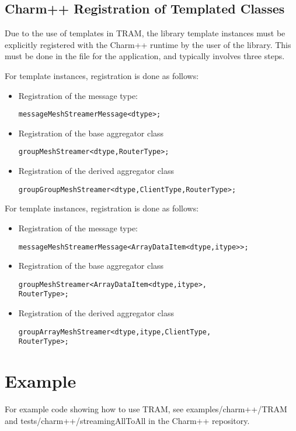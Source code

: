 \subsection{Charm++ Registration of Templated Classes}

Due to the use of templates in TRAM, the library template instances must be
explicitly registered with the Charm++ runtime by the user of the library. This
must be done in the  file for the application, and typically involves
three steps.

For  template instances, registration is done as
follows:
\begin{itemize}
\item{Registration of the message type:}
\begin{alltt}
message MeshStreamerMessage<dtype>;
\end{alltt}
\item{Registration of the base aggregator class}
\begin{alltt}
group MeshStreamer<dtype, RouterType>;
\end{alltt}
\item{Registration of the derived aggregator class}
\begin{alltt}
group GroupMeshStreamer<dtype, ClientType, RouterType>;
\end{alltt}
\end{itemize}

For  template instances, registration is done as
follows:
\begin{itemize}
\item{Registration of the message type:}
\begin{alltt}
message MeshStreamerMessage<ArrayDataItem<dtype, itype> >;
\end{alltt}
\item{Registration of the base aggregator class}
\begin{alltt}
group MeshStreamer<ArrayDataItem<dtype, itype>,
                   RouterType>;
\end{alltt}
\item{Registration of the derived aggregator class}
\begin{alltt}
group ArrayMeshStreamer<dtype, itype, ClientType,
                        RouterType>;
\end{alltt}
\end{itemize}

\section{Example}

For example code showing how to use TRAM, see examples/charm++/TRAM and
tests/charm++/streamingAllToAll in the Charm++ repository.

\thispagestyle{empty}
\pagestyle{empty}
